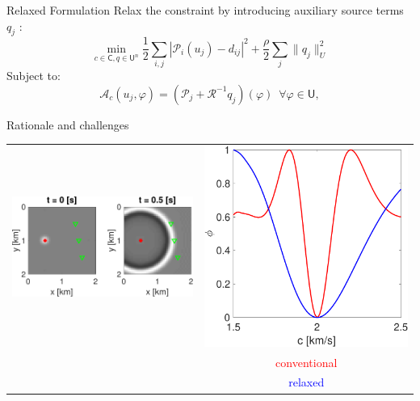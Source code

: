 \documentclass{beamer}
\newcommand{\sU}{\mathsf{U}}
\newcommand{\sC}{\mathsf{C}}
\newcommand{\mA}{\mathcal{A}}
\newcommand{\mP}{\mathcal{P}}
\newcommand{\mR}{\mathcal{R}}
\begin{document}
\begin{frame}{Relaxed Formulation}
Relax the constraint by introducing auxiliary source terms $q_j$ \cite{van2015penalty}:
\begin{equation}
  \label{eq:relaxed}
\min_{c\in\sC, q\in\sU^n} \frac{1}{2} \sum_{i,j} |\mP_i(u_j) - d_{ij}|^2 + \frac{\rho}{2} \sum_j \|q_j\|_U^2
\end{equation}
Subject to:
\begin{equation*}
\mA_c(u_j, \varphi) = (\mP_j + \mR^{-1}q_j)(\varphi) \,\,\, \forall \varphi \in \sU,
\end{equation*}
\end{frame}

\begin{frame}{Rationale and challenges}
\centering
\begin{tabular}{cc}
  \includegraphics[scale=.35]{./figs/exampe2a-eps-converted-to.pdf} &
  \includegraphics[scale=.2]{./figs/example3a-eps-converted-to.pdf} \\
    & \textcolor{red}{conventional} \\
  & \textcolor{blue}{relaxed}
\end{tabular}


\end{frame}
\end{document}
